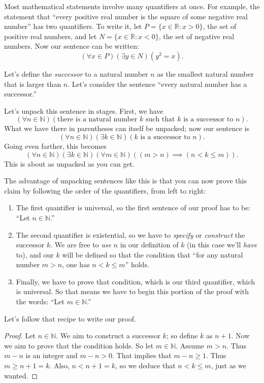 \documentclass[11pt,dvipsnames]{book}
\numberwithin{figure}{section} %
\numberwithin{table}{section} %
\begin{document}
Most mathematical statements involve many quantifiers at once.
For example, the statement that ``every positive real number is the square of some negative real number'' has two quantifiers.
To write it, let $P = \{ x \in \mathbb{R} : x > 0\}$, the set of positive real numbers, and let $N = \{ x \in \mathbb{R} : x < 0\}$, the set of negative real numbers.
Now our sentence can be written:
\[
    (\forall x \in P)(\exists y \in N)(y^2 = x).
\]
\begin{example}
    Let's define the \emph{successor} to a natural number $n$ as the smallest natural number that is larger than $n$.
    Let's consider the sentence ``every natural number has a successor.''

    Let's unpack this sentence in stages.
    First, we have
    \[
        (\forall n \in \mathbb{N})(\text{there is a natural number $k$ such that $k$ is a successor to $n$}).
    \]
    What we have there in parentheses can itself be unpacked;
    now our sentence is
    \[
        (\forall n \in \mathbb{N})(\exists k \in \mathbb{N})(\text{$k$ is a successor to $n$}).
    \]
    Going even farther, this becomes
    \[
        (\forall n \in \mathbb{N})(\exists k \in \mathbb{N})(\forall m \in \mathbb{N})((m>n) \implies (n<k\leq m)).
    \]
    This is about as unpacked as you can get.
    
    The advantage of unpacking sentences like this is that you can now prove this claim by following the order of the quantifiers, from left to right:
    \begin{enumerate}[label=(\alph*)]
        \item The first quantifier is universal, so the first sentence of our proof has to be: ``Let $n \in \mathbb{N}$.''
        \item The second quantifier is existential, so we have to \emph{specify} or \emph{construct} the successor $k$. We are free to \emph{use} $n$ in our definition of $k$ (in this case we'll \emph{have} to), and our $k$ will be defined so that the condition that ``for any natural number $m>n$, one has $n<k\leq m$'' holds.
        \item Finally, we have to prove that condition, which is our third quantifier, which is universal. So that means we have to begin this portion of the proof with the words: ``Let $m \in \mathbb{N}$.''
    \end{enumerate}
    
    Let's follow that recipe to write our proof.
    \begin{proof}
        Let $n \in \mathbb{N}$.
        We aim to construct a successor $k$;
        so define $k$ as $n+1$.
        Now we aim to prove that the condition holds.
        So let $m \in \mathbb{N}$.
        Assume $m > n$.
        Thus $m - n$ is an integer and $m-n>0$.
        That implies that $m-n\geq 1$.
        Thus $m \geq n+1=k$.
        Also, $n< n+1=k$, so we deduce that $n< k \leq m$, just as we wanted.
    \end{proof}
\end{example}
\end{document}
